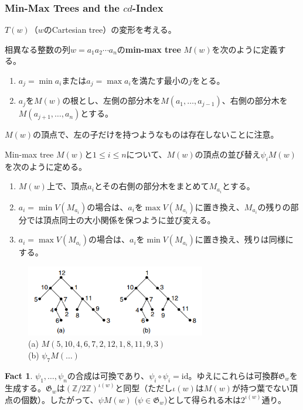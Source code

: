 \documentclass[xelatex,ja=standard,a4paper,14pt,everyparhook=compat]{bxjsarticle}
\theoremstyle{definition}
\newtheorem{fact}{Fact}
\begin{document}
\setcounter{section}{1}
\setcounter{subsection}{6}
\setcounter{subsubsection}{2}

\subsubsection{Min-Max Trees and the $cd$-Index}

$T(w)$（$w$のCartesian tree）の変形を考える。

相異なる整数の列$w = a_1 a_2 \cdots a_n$の\textbf{min-max tree} $M(w)$を次のように定義する。
\begin{enumerate}[1.]
    \item $a_j = \min a_i$または$a_j = \max a_i$を満たす最小の$j$をとる。
    \item $a_j$を$M(w)$の根とし、左側の部分木を$M(a_1, \ldots, a_{j-1})$、右側の部分木を$M(a_{j+1}, \ldots, a_n)$とする。
\end{enumerate}
$M(w)$の頂点で、左の子だけを持つようなものは存在しないことに注意。

Min-max tree $M(w)$と$1 \leq i \leq n$について、$M(w)$の頂点の並び替え$\psi_i M(w)$を次のように定める。
\begin{enumerate}[1.]
    \item $M(w)$上で、頂点$a_i$とその右側の部分木をまとめて$M_{a_i}$とする。
    \item $a_i = \min V(M_{a_i})$の場合は、$a_i$を$\max V(M_{a_i})$に置き換え、$M_{a_i}$の残りの部分では頂点同士の大小関係を保つように並び変える。
    \item $a_i = \max V(M_{a_i})$の場合は、$a_i$を$\min V(M_{a_i})$に置き換え、残りは同様にする。
\end{enumerate}

\begin{figure}[ht]
    \centering
    \includegraphics[width=0.7\textwidth]{1.11.png}
    \caption{(a) $M(5,10,4,6,7,2,12,1,8,11,9,3)$ \\
        (b) $\psi_7 M(\ldots)$}
\end{figure}

\begin{fact}
    $\psi_1, \ldots, \psi_n$の合成は可換であり、$\psi_i \circ \psi_i = \mathrm{id}$。ゆえにこれらは可換群$\mathfrak G_w$を生成する。$\mathfrak G_w$は$(\mathbb Z/2\mathbb Z)^{\iota(w)}$と同型（ただし$\iota(w)$は$M(w)$が持つ葉でない頂点の個数）。したがって、$\psi M(w)$ ($\psi \in \mathfrak G_w$)として得られる木は$2^{\iota(w)}$通り。
\end{fact}
\end{document}
